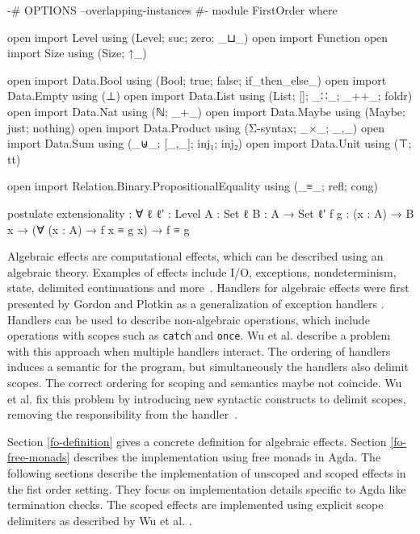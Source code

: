 \begin{code}[hide]
{-# OPTIONS --overlapping-instances #-}
module FirstOrder where

open import Level using (Level; suc; zero; _⊔_)
open import Function
open import Size using (Size; ↑_)

open import Data.Bool using (Bool; true; false; if_then_else_)
open import Data.Empty using (⊥)
open import Data.List using (List; []; _∷_; _++_; foldr)
open import Data.Nat using (ℕ; _+_)
open import Data.Maybe using (Maybe; just; nothing)
open import Data.Product using (Σ-syntax; _×_; _,_)
open import Data.Sum using (_⊎_; [_,_]; inj₁; inj₂)
open import Data.Unit using (⊤; tt)

open import Relation.Binary.PropositionalEquality using (_≡_; refl; cong)

postulate
  extensionality : ∀ {ℓ ℓ′ : Level} {A : Set ℓ} {B : A → Set ℓ′} {f g : (x : A) → B x}
      → (∀ (x : A) → f x ≡ g x) → f ≡ g
\end{code}


Algebraic effects are computational effects, which can be described using an
algebraic theory.
Examples of effects include I/O, exceptions, nondeterminism, state, delimited
continuations and more~\cite{DBLP:journals/corr/abs-1807-05923}.
Handlers for algebraic effects were first presented by Gordon and Plotkin
as a generalization of exception handlers \cite{}. %
Handlers can be used to describe non-algebraic operations, which include
operations with scopes such as \texttt{catch} and \texttt{once}.
Wu et al. describe a problem with this approach when multiple handlers
interact.
The ordering of handlers induces a semantic for the program, but simultaneously
the handlers also delimit scopes.
The correct ordering for scoping and semantics maybe not coincide.
Wu et al. fix this problem by introducing new syntactic constructs to delimit
scopes, removing the responsibility from the
handler~\cite{DBLP:conf/haskell/WuSH14,DBLP:conf/lics/PirogSWJ18}.

Section \ref{fo-definition} gives a concrete definition for algebraic effects.
Section \ref{fo-free-monads} describes the implementation using free monads in
Agda.
The following sections describe the implementation of unscoped and scoped
effects in the fist order setting. They focus on implementation details specific
to Agda like termination checks.
The scoped effects are implemented using explicit scope delimiters as described
by Wu et al. \cite{DBLP:conf/haskell/WuSH14}.

